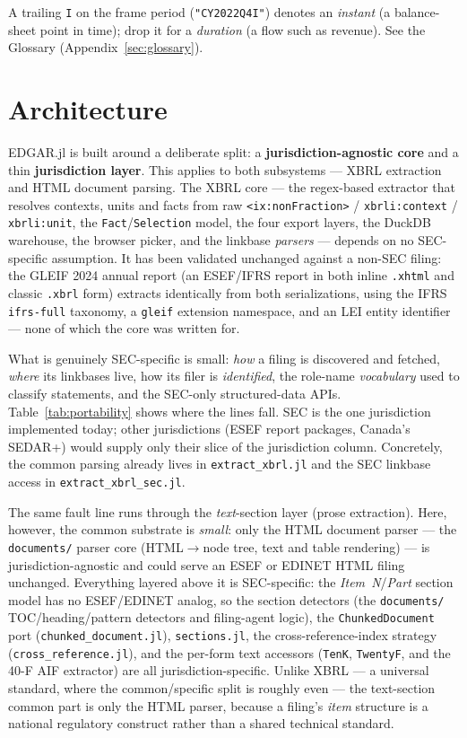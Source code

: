 \documentclass[11pt,a4paper]{report}
\begin{document}
\noindent
A trailing \texttt{I} on the frame period (\texttt{"CY2022Q4I"}) denotes an
\emph{instant} (a balance-sheet point in time); drop it for a \emph{duration}
(a flow such as revenue). See the Glossary (Appendix~\ref{sec:glossary}).


\chapter{Architecture}
\label{sec:architecture}

EDGAR.jl is built around a deliberate split: a \textbf{jurisdiction-agnostic core} and a thin
\textbf{jurisdiction layer}. This applies to both subsystems --- XBRL extraction and HTML document
parsing. The XBRL core --- the regex-based extractor that resolves contexts, units
and facts from raw \texttt{<ix:nonFraction>} / \texttt{xbrli:context} / \texttt{xbrli:unit}, the
\texttt{Fact}/\texttt{Selection} model, the four export layers, the DuckDB warehouse, the browser
picker, and the linkbase \emph{parsers} --- depends on no SEC-specific assumption. It has been
validated unchanged against a non-SEC filing: the GLEIF 2024 annual report (an ESEF/IFRS report in
both inline \texttt{.xhtml} and classic \texttt{.xbrl} form) extracts identically from both
serializations, using the IFRS \texttt{ifrs-full} taxonomy, a \texttt{gleif} extension namespace,
and an LEI entity identifier --- none of which the core was written for.

What is genuinely SEC-specific is small: \emph{how} a filing is discovered and fetched, \emph{where}
its linkbases live, how its filer is \emph{identified}, the role-name \emph{vocabulary} used to
classify statements, and the SEC-only structured-data APIs. Table~\ref{tab:portability} shows where
the lines fall. SEC is the one jurisdiction implemented today; other jurisdictions (ESEF report
packages, Canada's SEDAR+) would supply only their slice of the jurisdiction column. Concretely, the
common parsing already lives in \texttt{extract\_xbrl.jl} and the SEC linkbase access in
\texttt{extract\_xbrl\_sec.jl}.

The same fault line runs through the \emph{text}-section layer (prose extraction). Here, however, the
common substrate is \emph{small}: only the HTML document parser --- the \texttt{documents/} parser
core (HTML$\rightarrow$node tree, text and table rendering) --- is jurisdiction-agnostic
and could serve an ESEF or EDINET HTML filing unchanged. Everything layered above it is
SEC-specific: the \emph{Item~N}/\emph{Part} section model has no ESEF/EDINET analog, so the section detectors
(the \texttt{documents/} TOC/heading/pattern detectors and filing-agent logic), the
\texttt{ChunkedDocument} port (\texttt{chunked\_document.jl}), \texttt{sections.jl}, the
cross-reference-index strategy (\texttt{cross\_reference.jl}), and the per-form text accessors
(\texttt{TenK}, \texttt{TwentyF}, and the 40-F AIF extractor) are all jurisdiction-specific. Unlike
XBRL --- a universal standard, where the common/specific split is roughly even --- the text-section
common part is only the HTML parser, because a filing's \emph{item} structure is a national
regulatory construct rather than a shared technical standard.
\end{document}

